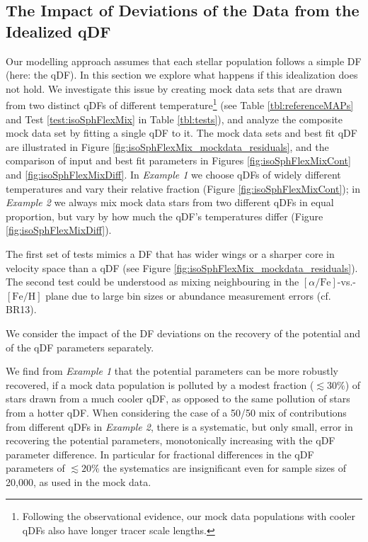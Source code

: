 \subsection{The Impact of Deviations of the Data from the Idealized qDF} \label{sec:results_mixedDFs}

Our modelling approach assumes that each stellar population follows a simple DF (here: the qDF). In this section we explore what happens if this idealization does not hold. We investigate this issue by creating mock data sets that are drawn from two distinct qDFs of different temperature\footnote{Following the observational evidence, our mock data populations with cooler qDFs also have longer tracer scale lengths.} (see Table \ref{tbl:referenceMAPs} and Test \ref{test:isoSphFlexMix} in Table \ref{tbl:tests}), and analyze the composite mock data set by fitting a single qDF to it. The mock data sets and best fit qDF are illustrated in Figure \ref{fig:isoSphFlexMix_mockdata_residuals}, and the comparison of input and best fit parameters in Figures \ref{fig:isoSphFlexMixCont} and \ref{fig:isoSphFlexMixDiff}. In \emph{Example 1} we choose qDFs of widely different temperatures and vary their relative fraction (Figure \ref{fig:isoSphFlexMixCont}); in \emph{Example 2} we always mix mock data stars from two different qDFs in equal proportion, but vary by how much the qDF's temperatures differ (Figure \ref{fig:isoSphFlexMixDiff}). 

The first set of tests mimics a DF that has wider wings or a sharper core in velocity space than a qDF (see Figure \ref{fig:isoSphFlexMix_mockdata_residuals}). The second test could be understood as mixing neighbouring \MAPs{} in the $[\alpha/\mathrm{Fe}]$-vs.-$[\mathrm{Fe}/\mathrm{H}]$ plane due to large bin sizes or abundance measurement errors (cf. BR13). 


We consider the impact of the DF deviations on the recovery of the potential and of the qDF parameters separately. 

We find from \emph{Example 1} that the potential parameters can be more robustly recovered, if a mock data population is polluted by a modest fraction ($\lesssim 30\%$) of stars drawn from a much cooler qDF, as opposed to the same pollution of stars from a hotter qDF. When considering the case of a 50/50 mix of contributions from different qDFs in \emph{Example 2}, there is a systematic, but only small, error in recovering the potential parameters, monotonically increasing with the qDF parameter difference. In particular for fractional differences in the qDF parameters of $\lesssim 20\%$ the systematics are insignificant even for sample sizes of 20,000, as used in the mock data.

